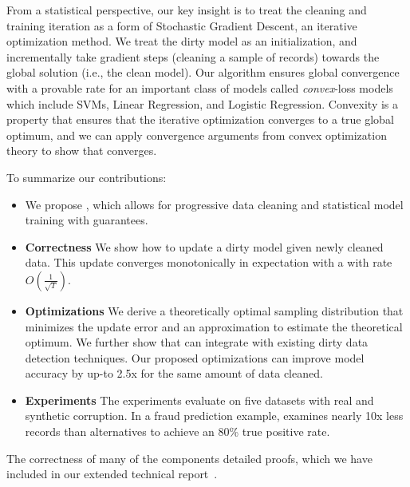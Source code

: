 From a statistical perspective, our key insight is to treat the cleaning and training iteration as a form of Stochastic Gradient Descent, an iterative optimization method.
We treat the dirty model as an initialization, and incrementally take gradient steps (cleaning a sample of records) towards the global solution (i.e., the clean model).
Our algorithm ensures global convergence with a provable rate for an important class of models called \emph{convex}-loss models which include SVMs, Linear Regression, and Logistic Regression.
Convexity is a property that ensures that the iterative optimization converges to a true global optimum, and we can apply convergence arguments from convex optimization theory to show that \sys converges.

To summarize our contributions:
\begin{itemize}[noitemsep]
\item We propose \sys, which allows for progressive data cleaning and statistical model training with guarantees.
\item \textbf{Correctness} We show how to update a dirty model given newly cleaned data. This update converges monotonically in expectation with a with rate $O(\frac{1}{\sqrt{T}})$.
\item \textbf{Optimizations} We derive a theoretically optimal sampling distribution that minimizes the update error and an approximation to estimate the theoretical optimum. We further show that \sys can integrate with existing dirty data detection techniques. Our proposed optimizations can improve model accuracy by up-to 2.5x for the same amount of data cleaned.
\item \textbf{Experiments} The experiments evaluate \sys on five datasets with real and synthetic corruption. In a fraud prediction example, \sys examines nearly 10x less records than alternatives to achieve an 80\% true positive rate.
\end{itemize}
The correctness of many of the components detailed proofs, which we have included in our extended technical report~\cite{activecleanarxiv}.





